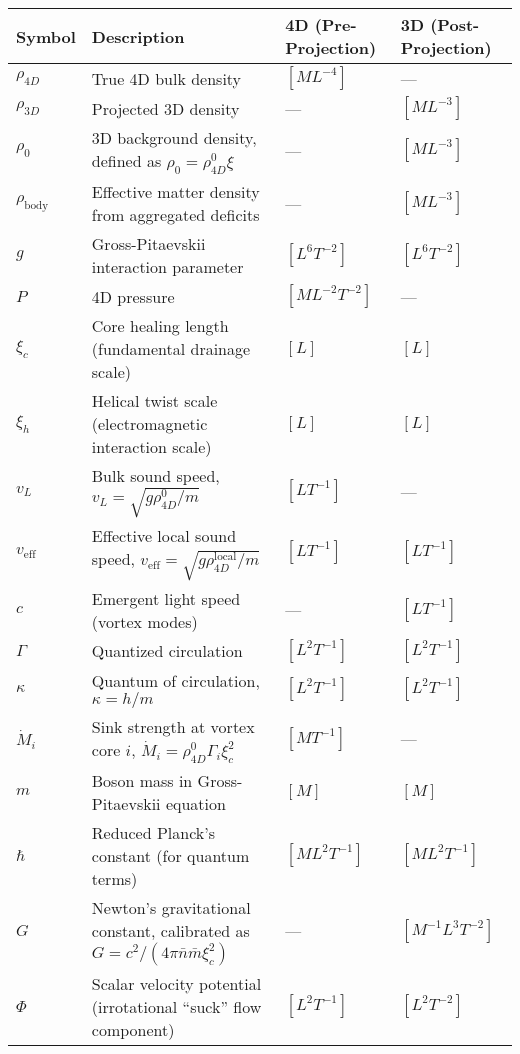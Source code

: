 \begin{table}[H]
\centering
\begin{tabularx}{\textwidth}{|l|Y|l|l|}
\hline
Symbol & Description & 4D (Pre-Projection) & 3D (Post-Projection) \\
\hline
$\rho_{4D}$ & True 4D bulk density & $[M L^{-4}]$ & --- \\
\hline
$\rho_{3D}$ & Projected 3D density & --- & $[M L^{-3}]$ \\
\hline
$\rho_0$ & 3D background density, defined as $\rho_0 = \rho_{4D}^0 \xi$ & --- & $[M L^{-3}]$ \\
\hline
$\rho_{\text{body}}$ & Effective matter density from aggregated deficits & --- & $[M L^{-3}]$ \\
\hline
$g$ & Gross-Pitaevskii interaction parameter & $[L^6 T^{-2}]$ & $[L^6 T^{-2}]$ \\
\hline
$P$ & 4D pressure & $[M L^{-2} T^{-2}]$ & --- \\
\hline
$\xi_c$ & Core healing length (fundamental drainage scale) & $[L]$ & $[L]$ \\
\hline
$\xi_h$ & Helical twist scale (electromagnetic interaction scale) & $[L]$ & $[L]$ \\
\hline
$v_L$ & Bulk sound speed, $v_L = \sqrt{g \rho_{4D}^0 / m}$ & $[L T^{-1}]$ & --- \\
\hline
$v_{\text{eff}}$ & Effective local sound speed, $v_{\text{eff}} = \sqrt{g \rho_{4D}^{\text{local}} / m}$ & $[L T^{-1}]$ & $[L T^{-1}]$ \\
\hline
$c$ & Emergent light speed (vortex modes) & --- & $[L T^{-1}]$ \\
\hline
$\Gamma$ & Quantized circulation & $[L^2 T^{-1}]$ & $[L^2 T^{-1}]$ \\
\hline
$\kappa$ & Quantum of circulation, $\kappa = h / m$ & $[L^2 T^{-1}]$ & $[L^2 T^{-1}]$ \\
\hline
$\dot{M}_i$ & Sink strength at vortex core $i$, $\dot{M}_i = \rho_{4D}^0 \Gamma_i \xi_c^2$ & $[M T^{-1}]$ & --- \\
\hline
$m$ & Boson mass in Gross-Pitaevskii equation & $[M]$ & $[M]$ \\
\hline
$\hbar$ & Reduced Planck's constant (for quantum terms) & $[M L^2 T^{-1}]$ & $[M L^2 T^{-1}]$ \\
\hline
$G$ & Newton's gravitational constant, calibrated as $G = c^2 / (4\pi \bar{n} \bar{m} \xi_c^2)$ & --- & $[M^{-1} L^3 T^{-2}]$ \\
\hline
$\Phi$ & Scalar velocity potential (irrotational ``suck'' flow component) & $[L^2 T^{-1}]$ & $[L^2 T^{-2}]$ \\

\end{tabularx}
\end{table}
